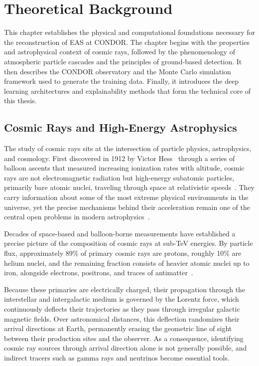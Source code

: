 \chapter{Theoretical Background} \label{ch:theo-back}

This chapter establishes the physical and computational foundations necessary for the reconstruction of EAS at CONDOR. The chapter begins with the properties and astrophysical context of cosmic rays, followed by the phenomenology of atmospheric particle cascades and the principles of ground-based detection. It then describes the CONDOR observatory and the Monte Carlo simulation framework used to generate the training data. Finally, it introduces the deep learning architectures and explainability methods that form the technical core of this thesis.

\section{Cosmic Rays and High-Energy Astrophysics}

The study of cosmic rays sits at the intersection of particle physics, astrophysics, and cosmology. First discovered in 1912 by Victor Hess~ through a series of balloon ascents that measured increasing ionization rates with altitude, cosmic rays are not electromagnetic radiation but high-energy subatomic particles, primarily bare atomic nuclei, traveling through space at relativistic speeds~. They carry information about some of the most extreme physical environments in the universe, yet the precise mechanisms behind their acceleration remain one of the central open problems in modern astrophysics~.

Decades of space-based and balloon-borne measurements have established a precise picture of the composition of cosmic rays at sub-TeV energies. By particle flux, approximately 89\% of primary cosmic rays are protons, roughly 10\% are helium nuclei, and the remaining fraction consists of heavier atomic nuclei up to iron, alongside electrons, positrons, and traces of antimatter~.

Because these primaries are electrically charged, their propagation through the interstellar and intergalactic medium is governed by the Lorentz force, which continuously deflects their trajectories as they pass through irregular galactic magnetic fields. Over astronomical distances, this deflection randomizes their arrival directions at Earth, permanently erasing the geometric line of sight between their production sites and the observer. As a consequence, identifying cosmic ray sources through arrival direction alone is not generally possible, and indirect tracers such as gamma rays and neutrinos become essential tools.

